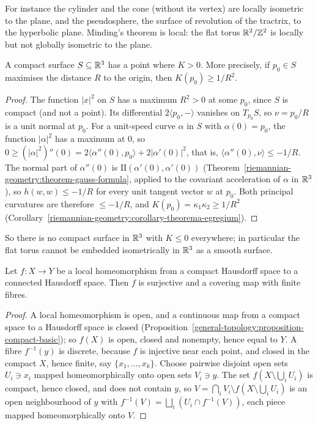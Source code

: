 For instance the cylinder and the cone (without its vertex) are locally isometric to the plane, and the pseudosphere, the surface of revolution of the tractrix, to the hyperbolic
plane. Minding's theorem is local: the flat torus $\mathbb{R}^2/\mathbb{Z}^2$ is locally but not globally isometric to the plane.

\begin{lemma}\label{riemannian-geometry:lemma-elliptic-point}
A compact surface $S \subseteq \mathbb{R}^3$ has a point where $K > 0$. More precisely, if $p_0 \in S$ maximises the distance $R$ to the origin, then $K(p_0) \geq 1/R^2$.
\end{lemma}

\begin{proof}
The function $|x|^2$ on $S$ has a maximum $R^2 > 0$ at some $p_0$, since $S$ is compact (and not a point). Its differential $2\langle p_0, -\rangle$ vanishes on $T_{p_0}S$, so
$\nu = p_0/R$ is a unit normal at $p_0$. For a unit-speed curve $\alpha$ in $S$ with $\alpha(0) = p_0$, the function $|\alpha|^2$ has a maximum at $0$, so
$0 \geq (|\alpha|^2)''(0) = 2\langle\alpha''(0), p_0\rangle + 2|\alpha'(0)|^2$, that is, $\langle\alpha''(0), \nu\rangle \leq -1/R$. The normal part of $\alpha''(0)$ is
$\mathrm{II}(\alpha'(0), \alpha'(0))$ (Theorem~\ref{riemannian-geometry:theorem-gauss-formula}, applied to the covariant acceleration of $\alpha$ in $\mathbb{R}^3$), so
$h(w, w) \leq -1/R$ for every unit tangent vector $w$ at $p_0$. Both principal curvatures are therefore $\leq -1/R$, and $K(p_0) = \kappa_1\kappa_2 \geq 1/R^2$
(Corollary~\ref{riemannian-geometry:corollary-theorema-egregium}).
\end{proof}

So there is no compact surface in $\mathbb{R}^3$ with $K \leq 0$ everywhere; in particular the flat torus cannot be embedded isometrically in $\mathbb{R}^3$ as a smooth surface.

\begin{lemma}\label{riemannian-geometry:lemma-proper-covering}
Let $f \colon X \to Y$ be a local homeomorphism from a compact Hausdorff space to a connected Hausdorff space. Then $f$ is surjective and a covering map with finite fibres.
\end{lemma}

\begin{proof}
A local homeomorphism is open, and a continuous map from a compact space to a Hausdorff space is closed (Proposition~\ref{general-topology:proposition-compact-basic}); so $f(X)$ is
open, closed and nonempty, hence equal to $Y$. A fibre $f^{-1}(y)$ is discrete, because $f$ is injective near each point, and closed in the compact $X$, hence finite, say
$\{x_1, \ldots, x_k\}$. Choose pairwise disjoint open sets $U_i \ni x_i$ mapped homeomorphically onto open sets $V_i \ni y$. The set $f(X \setminus \bigcup_iU_i)$ is compact, hence
closed, and does not contain $y$, so $V = \bigcap_iV_i \setminus f(X \setminus \bigcup_iU_i)$ is an open neighbourhood of $y$ with $f^{-1}(V) = \bigsqcup_i(U_i \cap f^{-1}(V))$, each piece
mapped homeomorphically onto $V$.
\end{proof}

